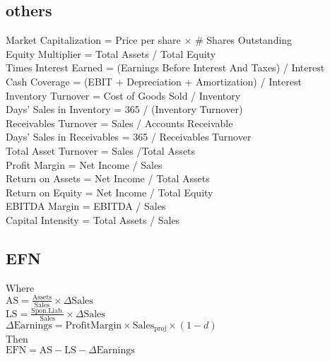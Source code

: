 \subsection*{others}
\begin{scriptsize}
Market Capitalization = Price per share $\times$ \# Shares Outstanding \\
Equity Multiplier = Total Assets / Total Equity \\
Times Interest Earned = (Earnings Before Interest And Taxes) / Interest \\
Cash Coverage = (EBIT + Depreciation + Amortization) / Interest \\
Inventory Turnover = Cost of Goods Sold / Inventory \\
Days' Sales in Inventory = 365 / (Inventory Turnover) \\
Receivables Turnover = Sales / Accounts Receivable \\
Days' Sales in Receivables = 365 / Receivables Turnover \\
Total Asset Turnover = Sales  /Total Assets  \\
Profit Margin = Net Income / Sales \\
Return on Assets = Net Income / Total Assets \\
Return on Equity = Net Income / Total Equity \\
EBITDA Margin = EBITDA / Sales \\
Capital Intensity = Total Assets / Sales \\
\subsection*{EFN}
Where \\
$\mathrm{AS} = \frac{\mathrm{Assets}}{\mathrm{Sales}}\times\Delta\mathrm{Sales}$ \\
$\mathrm{LS} = \frac{\mathrm{Spon. Liab.}}{\mathrm{Sales}}\times\Delta\mathrm{Sales}$ \\
$\Delta\mathrm{Earnings} = \mathrm{Profit Margin}\times\mathrm{Sales}_{\mathrm{proj}}\times\left(1 - d\right)$ \\
Then \\
$\mathrm{EFN} = \mathrm{AS} - \mathrm{LS} - \Delta\mathrm{Earnings}$ \\
\end{scriptsize}
